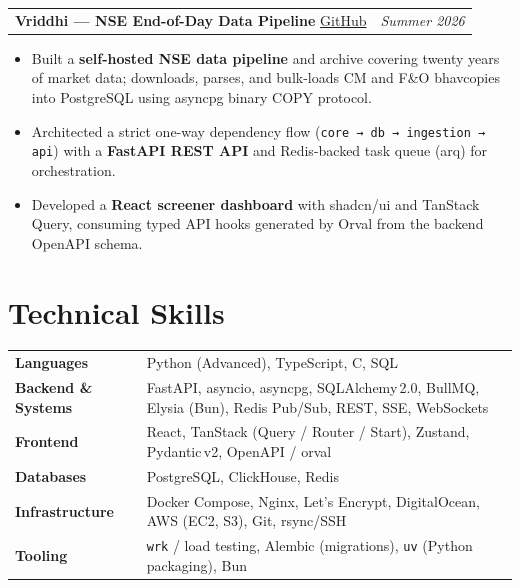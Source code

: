 \documentclass[10pt, letterpaper]{article}
\makeatletter
\newcommand{\projectentry}[3]{%
  \noindent
  \begin{tabularx}{\linewidth}{@{}X r@{}}
    \textbf{#1} \textbar{} \href{#2}{\small GitHub} & \textit{\small #3}
  \end{tabularx}%
}
\makeatother
\begin{document}
\vspace{3pt}

\projectentry{Vriddhi — NSE End-of-Day Data Pipeline}{https://github.com/penzulo/vriddhi}{Summer 2026}

\vspace{2pt}
\begin{itemize}
  \item Built a \textbf{self-hosted NSE data pipeline} and archive covering twenty years of market data; downloads, parses, and bulk-loads CM and F\&O bhavcopies into PostgreSQL using asyncpg binary COPY protocol.
  \item Architected a strict one-way dependency flow (\texttt{core → db → ingestion → api}) with a \textbf{FastAPI REST API} and Redis-backed task queue (arq) for orchestration.
  \item Developed a \textbf{React screener dashboard} with shadcn/ui and TanStack Query, consuming typed API hooks generated by Orval from the backend OpenAPI schema.
\end{itemize}


\section{Technical Skills}

\begin{tabularx}{\linewidth}{@{} l X @{}}
  \textbf{Languages}           & Python (Advanced), TypeScript, C, SQL \\[1pt]
  \textbf{Backend \& Systems}  & FastAPI, asyncio, asyncpg, SQLAlchemy\,2.0, BullMQ, Elysia (Bun), Redis Pub/Sub, REST, SSE, WebSockets \\[1pt]
  \textbf{Frontend}            & React, TanStack (Query / Router / Start), Zustand, Pydantic\,v2, OpenAPI / orval \\[1pt]
  \textbf{Databases}           & PostgreSQL, ClickHouse, Redis \\[1pt]
  \textbf{Infrastructure}      & Docker Compose, Nginx, Let's Encrypt, DigitalOcean, AWS (EC2, S3), Git, rsync/SSH \\[1pt]
  \textbf{Tooling}             & \texttt{wrk} / load testing, Alembic (migrations), \texttt{uv} (Python packaging), Bun \\
\end{tabularx}



\end{document}
